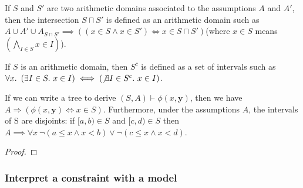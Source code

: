 \documentclass[]{article}
\begin{document}
\vspace{3mm}

\begin{definition}

If $S$ and $S'$ are two arithmetic domains associated to the
assumptions $A$ and $A'$, then the intersection $S\sqcap S'$ is
defined as an arithmetic domain such as\newline
$A \cup A' \cup A_{S\sqcap S'} \implies \left(\left(x \in S \land x \in S'\right)\iff x \in S \sqcap S'\right)$\newline (where
$x \in S$ means $\left(\bigwedge\limits_{I\in S} x \in I\right)$).

\label{domains}

\end{definition}

\vspace{3mm}

\begin{definition}

If $S$ is an arithmetic domain, then $S^c$ is defined as a set of
intervals such as
$\forall x.\ \left( \exists I \in S.\ x \in I\right) \iff \left( \not\exists I \in S^c.\ x \in I\right)$.

\label{complementary}

\end{definition}

\vspace{3mm}

\begin{lemma}[]

If we can write a tree to derive $(S, A) \vdash \phi(x, \mathbf{y})$,
then we have
$A \Rightarrow \left(\phi(x, \mathbf{y}) \iff x \in S\right)$.
Furthermore, under the assumptions $A$, the intervals of S are
disjoints: \newline
if $[a, b) \in S$ and $[c, d) \in S$ then
$A \implies \forall x\ \lnot \left( a \leq x \land x < b\right) \lor \lnot \left( c \leq x \land x < d \right)$.

\label{}

\end{lemma}

\begin{proof}
\end{proof}

\subsubsection{Interpret a constraint with a
model}\label{interpret-a-constraint-with-a-model}
\end{document}
